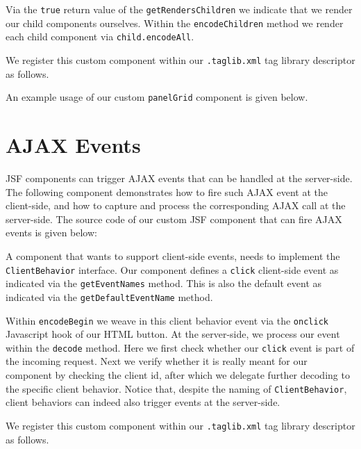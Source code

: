 Via the \texttt{true} return value of the \texttt{getRendersChildren} we indicate that we render our child components ourselves.
Within the \texttt{encodeChildren} method we render each child component via \texttt{child.encodeAll}.

We register this custom component within our \texttt{.taglib.xml} tag library descriptor as follows.


An example usage of our custom \texttt{panelGrid} component is given below.



\section{AJAX Events}
JSF components can trigger AJAX events that can be handled at the server-side.
The following component demonstrates how to fire such AJAX event at the client-side, and how to capture and process the corresponding AJAX call at the server-side.
The source code of our custom JSF component that can fire AJAX events is given below:

A component that wants to support client-side events, needs to implement the \texttt{ClientBehavior} interface.
Our component defines a \texttt{click} client-side event as indicated via the \texttt{getEventNames} method.
This is also the default event as indicated via the \texttt{getDefaultEventName} method.

Within \texttt{encodeBegin} we weave in this client behavior event via the \texttt{onclick} Javascript hook of our HTML button.
At the server-side, we process our event within the \texttt{decode} method.
Here we first check whether our \texttt{click} event is part of the incoming request.
Next we verify whether it is really meant for our component by checking the client id, after which we delegate further decoding to the specific client behavior.
Notice that, despite the naming of \texttt{ClientBehavior}, client behaviors can indeed also trigger events at the server-side.

We register this custom component within our \texttt{.taglib.xml} tag library descriptor as follows.


